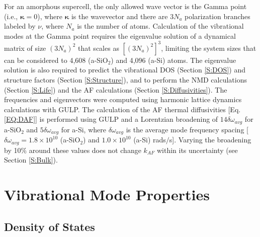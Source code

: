 \documentclass[aps,prb,onecolumn,preprint,superscriptaddress,footinbib,amsmath,amssymb,floatfix]{revtex4}
\begin{document}
For an amorphous supercell, 
the only allowed wave vector is the Gamma point 
(i.e., $\pmb{\kappa}=0$),  
where $\pmb{\kappa}$ is the wavevector and there are $3N_a$ 
polarization 
branches labeled by $\nu$, where $N_a$ is the number of atoms. 
Calculation of the vibrational modes at the Gamma point  
requires the eigenvalue solution of a dynamical matrix of size 
$(3N_a)^2$ that scales as $[(3N_a)^2]^3$, limiting the system 
sizes that can be considered to 4,608 (a-SiO$_2$) and 4,096 (a-Si) 
atoms. 
The eigenvalue solution is also required to predict the vibrational 
DOS (Section \ref{S:DOS}) and structure factors 
(Section \ref{S:Structure}), and to perform the NMD calculations  
(Section \ref{S:Life})  
and the AF calculations (Section \ref{S:Diffusivities}). 
The frequencies and eigenvectors were computed using harmonic
lattice dynamics calculations with GULP.\cite{gale_general_2003} 
The calculation of the AF thermal diffusivities 
[Eq. \eqref{EQ:DAF}] is performed using GULP and a Lorentzian 
broadening of $14\delta\omega_{avg}$ for a-SiO$_2$ and 
$5\delta\omega_{avg}$ for a-Si, 
where $\delta\omega_{avg}$ is the average mode 
frequency spacing 
[$\delta\omega_{avg} = 1.8 \times 10^{10}$ (a-SiO$_2$) 
and $1.0 \times 10^{10}$ (a-Si) rads$/$s].
\cite{feldman_thermal_1993,feldman_numerical_1999}  
Varying the broadening by 10$\%$ around these values does not 
change $k_{AF}$ within its uncertainty 
(see Section \ref{S:Bulk}).

\section{\label{S:Vibrational}Vibrational Mode Properties}

\subsection{\label{S:DOS}Density of States}
\end{document}
